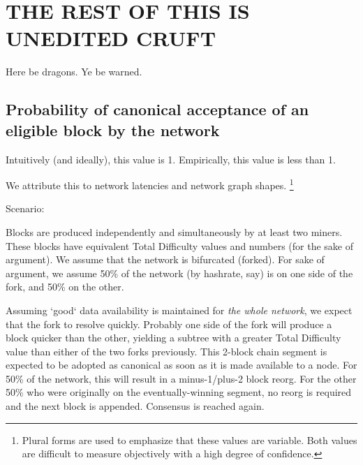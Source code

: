 \documentclass[11pt]{article}
\theoremstyle{plain}
\begin{document}
{%




\pagebreak
\section{\normalsize{THE REST OF THIS IS UNEDITED CRUFT}}

Here be dragons. Ye be warned.

\subsection{\normalsize{Probability of canonical acceptance of an eligible
block by the network}}

Intuitively (and ideally), this value is 1. 
Empirically, this value is less than 1.

We attribute this to network latencies and network graph shapes.\nolinebreak
\footnote{
Plural forms are used to emphasize that these values are variable.
Both values are difficult to measure objectively with a high degree of
confidence.
}

Scenario:

Blocks are produced independently and simultaneously by at least two miners.
These blocks have equivalent Total Difficulty values and numbers (for the sake
of argument).
We assume that the network is bifurcated (forked). For sake of argument, we
assume 50\% of the network (by hashrate, say) is on one side of the fork, and
50\% on the other.

Assuming `good` data availability is maintained for \textit{the whole network},
we expect that the fork to resolve quickly.
Probably one side of the fork will produce a block quicker than the other,
yielding a subtree with a greater Total Difficulty value than either of the two
forks previously.
This 2-block chain segment is expected to be adopted as canonical as soon as it
is made available to a node.
For 50\% of the network, this will result in a minus-1/plus-2 block reorg. For
the other 50\% who were originally on the eventually-winning segment, no reorg
is required and the next block is appended. Consensus is reached again.

}
\end{document}
